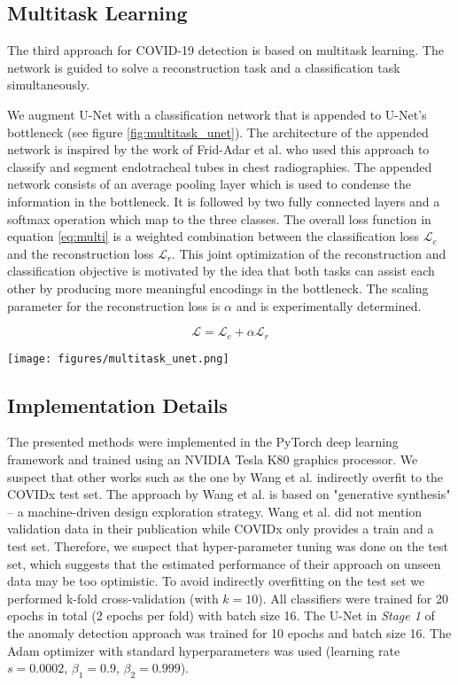 \documentclass[conference]{IEEEtran}
\begin{document}
\subsection{Multitask Learning}

The third approach for COVID-19 detection is based on multitask learning. The network is guided to solve a reconstruction task and a classification task simultaneously.

We augment U-Net with a classification network that is appended to U-Net's bottleneck (see figure \ref{fig:multitask_unet}). The architecture of the appended network is inspired by the work of Frid-Adar et al. \cite{fridadar2019endotracheal} who used this approach to classify and segment endotracheal tubes in chest radiographies. The appended network consists of an average pooling layer which is used to condense the information in the bottleneck. It is followed by two fully connected layers and a softmax operation which map to the three classes. The overall loss function in equation \ref{eq:multi} is a weighted combination between the classification loss $\mathcal{L}_c$ and the reconstruction loss $\mathcal{L}_r$. This joint optimization of the reconstruction and classification objective is motivated by the idea that both tasks can assist each other by producing more meaningful encodings in the bottleneck. The scaling parameter for the reconstruction loss is $\alpha$ and is experimentally determined. 

\begin{equation}
	\mathcal{L} = \mathcal{L}_c + \alpha \mathcal{L}_r 
	\label{eq:multi}
\end{equation}

\begin{figure*}
	\centering
	\texttt{[image: figures/multitask\_unet.png]}
	\caption{Architecture of Multitask U-Net}
	\label{fig:multitask_unet}
\end{figure*}

\subsection{Implementation Details}

The presented methods were implemented in the PyTorch deep learning framework and trained using an NVIDIA Tesla K80 graphics processor. We suspect that other works such as the one by Wang et al. \cite{wang2020covidnet} indirectly overfit to the COVIDx test set. The approach by Wang et al. is based on "generative synthesis" -- a machine-driven design exploration strategy. Wang et al. did not mention validation data in their publication while COVIDx only provides a train and a test set. Therefore, we suspect that hyper-parameter tuning was done on the test set, which suggests that the estimated performance of their approach on unseen data may be too optimistic. To avoid indirectly overfitting on the test set we performed k-fold cross-validation (with $k=10$). All classifiers were trained for 20 epochs in total (2 epochs per fold) with batch size 16. The U-Net in \textit{Stage 1} of the anomaly detection approach was trained for 10 epochs and batch size 16. The Adam optimizer with standard hyperparameters was used (learning rate $s=0.0002$, $\beta_1=0.9$, $\beta_2=0.999$).
\end{document}
